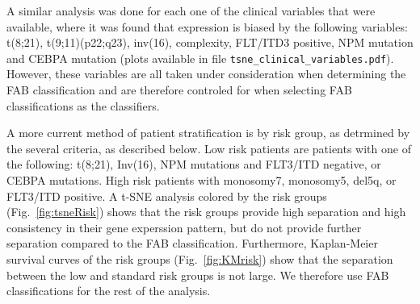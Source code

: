 \documentclass[10pt, letterpaper, twoside, english]{article}
\begin{document}
A similar analysis was done for each one of the clinical variables that were available,
where it was found that expression is biased by the following variables:
t(8;21), t(9;11)(p22;q23), inv(16), complexity, FLT/ITD3 positive, NPM mutation and CEBPA mutation
(plots available in file \verb!tsne_clinical_variables.pdf!).
However, these variables are all taken under consideration when determining the FAB classification 
and are therefore controled for when selecting FAB classifications as the classifiers.





A more current method of patient stratification is by risk group, as detrmined by the several criteria,
as described below.
Low risk patients are patients with one of the following:
t(8;21), Inv(16), NPM mutations and FLT3/ITD negative, or CEBPA mutations.
High risk patients with monosomy7, monosomy5, del5q, or FLT3/ITD positive.
A t-SNE analysis colored by the risk groups (Fig.~\ref{fig:tsneRisk}) shows that the risk groups 
provide high separation and high consistency in their gene experssion pattern, 
but do not provide further separation compared to the FAB classification.
Furthermore, Kaplan-Meier survival curves of the risk groups (Fig.~\ref{fig:KMrisk})
show that the separation between the low and standard risk groups is not large.
We therefore use FAB classifications for the rest of the analysis.
\end{document}
